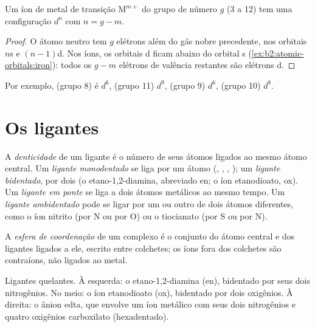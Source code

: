 \begin{proposition}\label{prop:b2:coordination-complexes:dn}
Um íon de metal de transição $\mathrm M^{m+}$ do grupo de número $g$ (3 a 12) tem uma
configuração $d^n$ com $n = g - m$.
\end{proposition}

\begin{proof}
O átomo neutro tem $g$ elétrons além do gás nobre precedente, nos orbitais $n$s
e $(n - 1)$d. Nos íons, os orbitais d ficam abaixo do orbital s
(\cref{ex:b2:atomic-orbitals:iron}): todos os $g - m$ elétrons de valência
restantes são elétrons d.
\end{proof}

Por exemplo,  (grupo 8) é $d^6$,  (grupo 11) $d^9$,  (grupo 9)
$d^6$,  (grupo 10) $d^8$.

\section{Os ligantes}

\begin{definition}[Denticidade]\label{def:b2:coordination-complexes:denticity}
A \emph{denticidade} de um ligante é o número de seus átomos
ligados ao mesmo átomo central. Um \emph{ligante monodentado} se
liga por um átomo (, , , ); um \emph{ligante
bidentado}, por dois (o etano-1,2-diamina, abreviado en; o
íon etanodioato, ox). Um \emph{ligante em ponte} se liga a
dois átomos metálicos ao mesmo tempo. Um \emph{ligante ambidentado} pode se
ligar por um ou outro de dois átomos diferentes, como o íon nitrito (por N ou por
O) ou o tiocianato (por S ou por N).
\end{definition}

\begin{definition}\label{def:b2:coordination-complexes:coordination-sphere}
A \emph{esfera de coordenação} de um complexo é o
conjunto do átomo central e dos ligantes ligados a ele, escrito entre
colchetes; os íons fora dos colchetes são contraíons, não ligados ao metal.
\end{definition}

\begin{omfigure}
\qquad
{}
\qquad
{}

\medskip
{\small Ligantes quelantes. À esquerda: o etano-1,2-diamina (en), bidentado por
seus dois nitrogênios. No meio: o íon etanodioato (ox), bidentado por dois
oxigênios. À direita: o ânion edta, que envolve um íon metálico com seus dois
nitrogênios e quatro oxigênios carboxilato (hexadentado).}
\end{omfigure}

